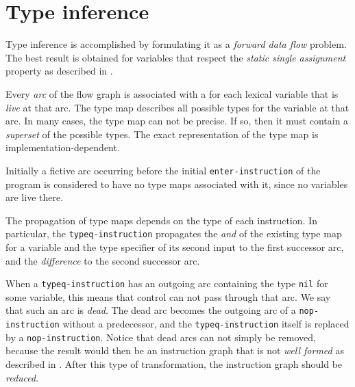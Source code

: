 \section{Type inference}
\label{sec-optimizations-type-inference}

Type inference is accomplished by formulating it as a \emph{forward
  data flow} problem.  The best result is obtained for variables that
respect the \emph{static single assignment} property as described in
. 

Every \emph{arc} of the flow graph is associated with a  for each lexical variable that is \emph{live} at that arc.  The
type map describes all possible types for the variable at that arc.
In many cases, the type map can not be precise.  If so, then it must
contain a \emph{superset} of the possible types.  The exact
representation of the type map is implementation-dependent. 

Initially a fictive arc occurring before the initial
\texttt{enter-instruction} of the program is considered to have no
type maps associated with it, since no variables are live there.  

The propagation of type maps depends on the type of each instruction.
In particular, the \texttt{typeq-instruction} propagates the
\emph{and} of the existing type map for a variable and the type
specifier of its second input to the first successor arc, and the
\emph{difference} to the second successor arc.  

When a \texttt{typeq-instruction} has an outgoing arc containing the
type \texttt{nil} for some variable, this means that control can not
pass through that arc.  We say that such an arc is \emph{dead}. 
The dead arc becomes the outgoing arc of a
\texttt{nop-instruction} without a predecessor, and the
\texttt{typeq-instruction} itself is replaced by a
\texttt{nop-instruction}.%
Notice that dead arcs can not simply be removed, because the result
would then be an instruction graph that is not \emph{well formed} as
described in .  After this type of transformation,
the instruction graph should be
\emph{reduced}.  

